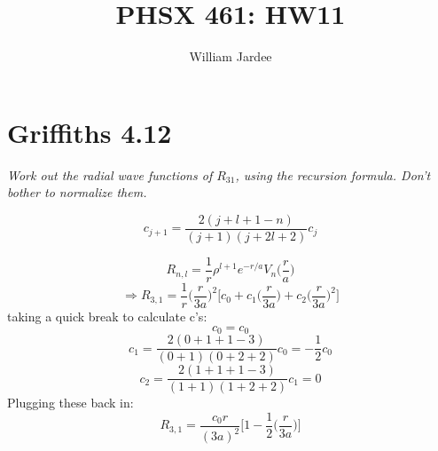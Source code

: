 \documentclass[12pt]{article}
\begin{document}
\title{PHSX 461: HW11}
\author{William Jardee}
\maketitle

\section*{Griffiths 4.12}
{\sl Work out the radial wave functions of $R_{31}$, using the recursion formula. Don't bother to normalize them.}

\begin{equation}
	\tag{Equation 4.76}
	c_{j+1} = \frac{2(j+l+1-n)}{(j+1)(j+2l+2)}c_j
	\label{eq:4.76}
\end{equation}

\[R_{n, l} = \frac{1}{r}\rho^{l+1}e^{-r/a}V_n\Big(\frac{r}{a}\Big)\]
\[\Rightarrow R_{3,1} = \frac{1}{r}\Big(\frac{r}{3a}\Big)^2 \Big[c_0 + c_1 \Big(\frac{r}{3a}\Big) + c_2 \Big(\frac{r}{3a}\Big)^2\Big]\]
taking a quick break to calculate c's:
\[c_0 = c_0\]
\[c_1 = \frac{2(0+1+1-3)}{(0+1)(0+2+2)}c_0 = -\frac{1}{2}c_0\]
\[c_2 = \frac{2(1+1+1-3)}{(1+1)(1+2+2)}c_1 = 0\]
Plugging these back in:
\[\boxed{R_{3,1} = \frac{c_0 r}{(3a)^2}\Big[1 - \frac{1}{2} \Big(\frac{r}{3a}\Big)\Big]}\]

\newpage
\end{document}
